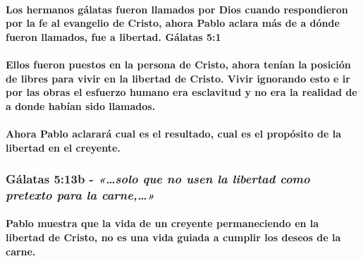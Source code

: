 \documentclass[11a pt,twoside]{article}
\newcommand{\scripture}[1]{%
  {\fontsize{12pt}{16pt}\selectfont\ScriptureFont\itshape #1}%
}
\let\oldsubsubsection\subsubsection
\renewcommand{\subsubsection}{\needspace{4\baselineskip}\oldsubsubsection}
\let\oldparagraph\paragraph
\renewcommand{\paragraph}{\needspace{3\baselineskip}\oldparagraph}
\begin{document}
\paragraph{Los hermanos gálatas fueron llamados por Dios cuando
respondieron por la fe al evangelio de Cristo, ahora Pablo aclara más de
a dónde fueron llamados, fue a libertad. Gálatas
5:1}\label{los-hermanos-guxe1latas-fueron-llamados-por-dios-cuando-respondieron-por-la-fe-al-evangelio-de-cristo-ahora-pablo-aclara-muxe1s-de-a-duxf3nde-fueron-llamados-fue-a-libertad.-guxe1latas-51}

\paragraph{Ellos fueron puestos en la persona de Cristo, ahora tenían la
posición de libres para vivir en la libertad de Cristo. Vivir ignorando
esto e ir por las obras el esfuerzo humano era esclavitud y no era la
realidad de a donde habían sido
llamados.}\label{ellos-fueron-puestos-en-la-persona-de-cristo-ahora-tenuxedan-la-posiciuxf3n-de-libres-para-vivir-en-la-libertad-de-cristo.-vivir-ignorando-esto-e-ir-por-las-obras-el-esfuerzo-humano-era-esclavitud-y-no-era-la-realidad-de-a-donde-habuxedan-sido-llamados.}

\paragraph{Ahora Pablo aclarará cual es el resultado, cual es el
propósito de la libertad en el
creyente.}\label{ahora-pablo-aclararuxe1-cual-es-el-resultado-cual-es-el-propuxf3sito-de-la-libertad-en-el-creyente.}

\subsubsection{\texorpdfstring{Gálatas 5:13b -
\scripture{«…solo que no usen la libertad como pretexto para la carne,…»}}{Gálatas 5:13b - }}\label{guxe1latas-513b---solo-que-no-usen-la-libertad-como-pretexto-para-la-carne}

\paragraph{Pablo muestra que la vida de un creyente permaneciendo en la
libertad de Cristo, no es una vida guiada a cumplir los deseos de la
carne.}\label{pablo-muestra-que-la-vida-de-un-creyente-permaneciendo-en-la-libertad-de-cristo-no-es-una-vida-guiada-a-cumplir-los-deseos-de-la-carne.}
\end{document}
